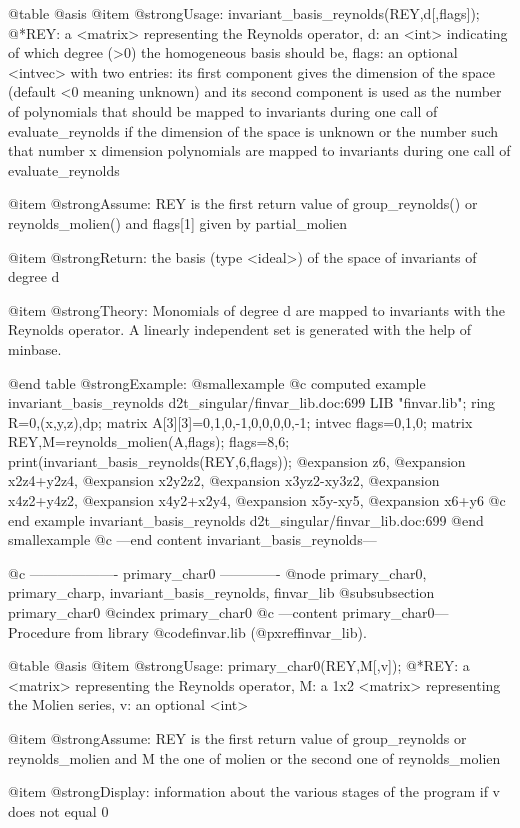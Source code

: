 @table @asis
@item @strong{Usage:}
invariant_basis_reynolds(REY,d[,flags]);
@*REY: a <matrix> representing the Reynolds operator, d: an <int>
indicating of which degree (>0) the homogeneous basis should be, flags:
an optional <intvec> with two entries: its first component gives the
dimension of the space (default <0 meaning unknown) and its second
component is used as the number of polynomials that should be mapped
to invariants during one call of evaluate_reynolds if the dimension of
the space is unknown or the number such that number x dimension
polynomials are mapped to invariants during one call of
evaluate_reynolds

@item @strong{Assume:}
REY is the first return value of group_reynolds() or reynolds_molien()
and flags[1] given by partial_molien

@item @strong{Return:}
the basis (type <ideal>) of the space of invariants of degree d

@item @strong{Theory:}
Monomials of degree d are mapped to invariants with the Reynolds
operator. A linearly independent set is generated with the help of
minbase.

@end table
@strong{Example:}
@smallexample
@c computed example invariant_basis_reynolds d2t_singular/finvar_lib.doc:699 
LIB "finvar.lib";
ring R=0,(x,y,z),dp;
matrix A[3][3]=0,1,0,-1,0,0,0,0,-1;
intvec flags=0,1,0;
matrix REY,M=reynolds_molien(A,flags);
flags=8,6;
print(invariant_basis_reynolds(REY,6,flags));
@expansion{} z6,
@expansion{} x2z4+y2z4,
@expansion{} x2y2z2,
@expansion{} x3yz2-xy3z2,
@expansion{} x4z2+y4z2,
@expansion{} x4y2+x2y4,
@expansion{} x5y-xy5,
@expansion{} x6+y6
@c end example invariant_basis_reynolds d2t_singular/finvar_lib.doc:699
@end smallexample
@c ---end content invariant_basis_reynolds---

@c ------------------- primary_char0 -------------
@node primary_char0, primary_charp, invariant_basis_reynolds, finvar_lib
@subsubsection primary_char0
@cindex primary_char0
@c ---content primary_char0---
Procedure from library @code{finvar.lib} (@pxref{finvar_lib}).

@table @asis
@item @strong{Usage:}
primary_char0(REY,M[,v]);
@*REY: a <matrix> representing the Reynolds operator, M: a 1x2 <matrix>
representing the Molien series, v: an optional <int>

@item @strong{Assume:}
REY is the first return value of group_reynolds or reynolds_molien and
M the one of molien or the second one of reynolds_molien

@item @strong{Display:}
information about the various stages of the program if v does not
equal 0

